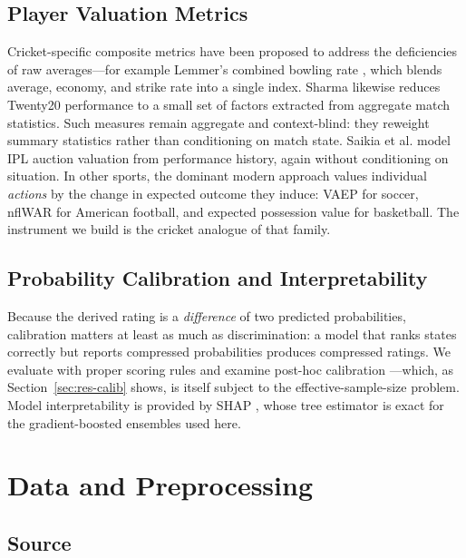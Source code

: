 \documentclass[conference]{IEEEtran}
\begin{document}
\subsection{Player Valuation Metrics}

Cricket-specific composite metrics have been proposed to address the
deficiencies of raw averages---for example Lemmer's combined bowling
rate \cite{lemmer2002}, which blends average, economy, and strike rate
into a single index. Sharma \cite{sharma2013} likewise reduces Twenty20
performance to a small set of factors extracted from aggregate match
statistics. Such measures remain aggregate and context-blind: they
reweight summary statistics rather than conditioning on match state.
Saikia et al. \cite{saikia2013} model IPL auction valuation from
performance history, again without conditioning on situation. In other
sports, the dominant modern approach values individual \emph{actions} by
the change in expected outcome they induce: VAEP \cite{decroos2019} for
soccer, nflWAR \cite{yurko2019} for American football, and expected
possession value \cite{cervone2016} for basketball. The instrument we
build is the cricket analogue of that family.

\subsection{Probability Calibration and Interpretability}

Because the derived rating is a \emph{difference} of two predicted
probabilities, calibration matters at least as much as discrimination: a
model that ranks states correctly but reports compressed probabilities
produces compressed ratings. We evaluate with proper scoring rules
\cite{brier1950} and examine post-hoc calibration
\cite{platt1999, niculescu2005}---which, as Section~\ref{sec:res-calib}
shows, is itself subject to the effective-sample-size problem. Model
interpretability is provided by SHAP \cite{lundberg2017}, whose tree
estimator is exact for the gradient-boosted ensembles \cite{chen2016}
used here.

\section{Data and Preprocessing}
\label{sec:data}

\subsection{Source}
\end{document}
